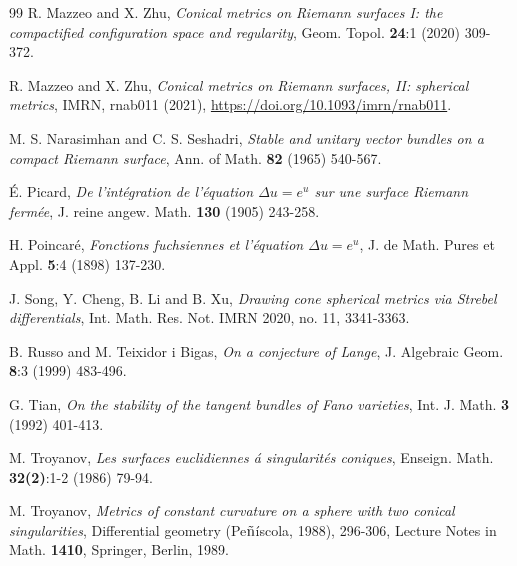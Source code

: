 \documentclass[12pt]{article}
\begin{document}
\begin{thebibliography}{99}
  R. Mazzeo and X. Zhu, \emph{Conical metrics on Riemann surfaces I: the compactified configuration space and regularity}, Geom. Topol. {\bf 24}:1 (2020) 309-372.

  R. Mazzeo and X. Zhu, \emph{Conical metrics on Riemann surfaces, II: spherical metrics}, IMRN, rnab011 (2021), \href{https://academic.oup.com/imrn/advance-article/doi/10.1093/imrn/rnab011/6161425}{https://doi.org/10.1093/imrn/rnab011}.

   M. S. Narasimhan and C. S. Seshadri, \emph{Stable and unitary vector bundles on a compact Riemann surface}, Ann. of Math. {\bf 82} (1965) 540-567.

   {\' E}. Picard, \emph{De l'int{\' e}gration de l'{\' e}quation $\Delta u =e^u$ sur une surface
Riemann ferm{\' e}e}, J. reine angew. Math. {\bf 130} (1905) 243-258.

  H. Poincar{\' e}, \emph{Fonctions fuchsiennes et l'{\' e}quation $\Delta u =e^u$},
J. de Math. Pures et Appl. {\bf 5}:4 (1898) 137-230.


   J. Song, Y. Cheng, B. Li and B. Xu, \emph{Drawing cone spherical metrics via Strebel differentials}, Int. Math. Res. Not. IMRN 2020, no. 11, 3341-3363.



  B. Russo and M. Teixidor i Bigas, \emph{On a conjecture of Lange}, J. Algebraic Geom. {\bf 8}:3 (1999) 483-496.

  G. Tian, \emph{On the stability of the tangent bundles of Fano varieties}, Int. J. Math. {\bf 3} (1992) 401-413.

  M. Troyanov, \emph{Les surfaces euclidiennes {\' a} singularit{\' e}s coniques},  Enseign. Math. {\bf 32(2)}:1-2 (1986)  79-94.

   M. Troyanov, \emph{Metrics of constant curvature on a sphere with two conical singularities}, Differential geometry (Pe${\rm \tilde{n}}${\' i}scola, 1988), 296-306, Lecture Notes in Math. {\bf 1410}, Springer, Berlin, 1989.


\end{thebibliography}
\end{document}
